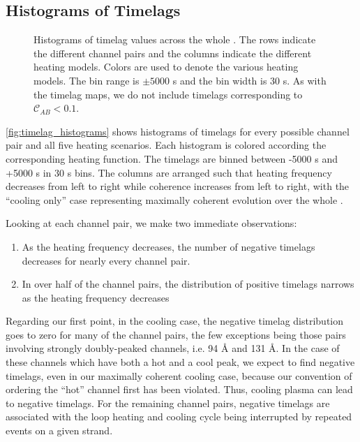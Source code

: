 \subsection{Histograms of Timelags}\label{timelag_histograms}


\begin{figure*}
    \caption{Histograms of timelag values across the whole \AR{}. The rows indicate the different channel pairs and the columns indicate the different heating models. Colors are used to denote the various heating models. The bin range is $\pm5000$ s and the bin width is 30 s. As with the timelag maps, we do not include timelags corresponding to $\mathcal{C}_{AB}<0.1$.}
    \label{fig:timelag_histograms}
\end{figure*}

\autoref{fig:timelag_histograms} shows histograms of timelags for every possible channel pair and all five heating scenarios. Each histogram is colored according the corresponding heating function. The timelags are binned between -5000 s and +5000 s in 30 s bins. The columns are arranged such that heating frequency decreases from left to right while coherence increases from left to right, with the ``cooling only'' case representing maximally coherent evolution over the whole \AR{}.

Looking at each channel pair, we make two immediate observations: 
\begin{enumerate}
\item As the heating frequency decreases, the number of negative timelags decreases for nearly every channel pair.
\item In over half of the channel pairs, the distribution of positive timelags narrows as the heating frequency decreases
\end{enumerate}

Regarding our first point, in the cooling case, the negative timelag distribution goes to zero for many of the channel pairs, the few exceptions being those pairs involving strongly doubly-peaked channels, i.e. 94 \AA{} and 131 \AA{}. In the case of these channels which have both a hot and a cool peak, we expect to find negative timelags, even in our maximally coherent cooling case, because our convention of ordering the ``hot'' channel first has been violated. Thus, cooling plasma can lead to negative timelags. For the remaining channel pairs, negative timelags are associated with the loop heating and cooling cycle being interrupted by repeated events on a given strand. 

